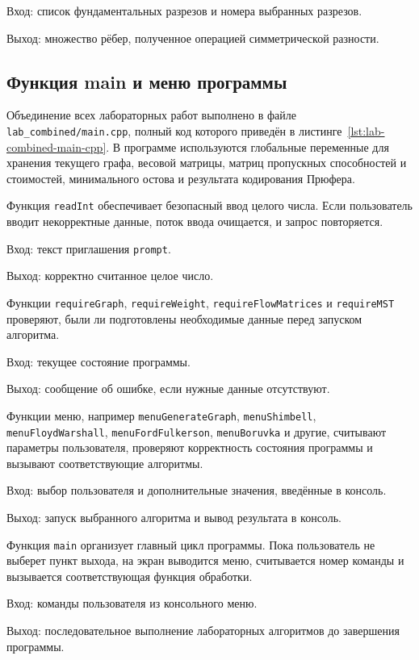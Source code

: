 \documentclass[a4paper,final]{article}
\begin{document}
Вход: список фундаментальных разрезов и номера выбранных разрезов.

Выход: множество рёбер, полученное операцией симметрической разности.

\subsection{Функция main и меню программы}

Объединение всех лабораторных работ выполнено в файле \texttt{lab\_combined/main.cpp}, полный код которого приведён в листинге~\ref{lst:lab-combined-main-cpp}. В программе используются глобальные переменные для хранения текущего графа, весовой матрицы, матриц пропускных способностей и стоимостей, минимального остова и результата кодирования Прюфера.

Функция \texttt{readInt} обеспечивает безопасный ввод целого числа. Если пользователь вводит некорректные данные, поток ввода очищается, и запрос повторяется.

Вход: текст приглашения \texttt{prompt}.

Выход: корректно считанное целое число.

Функции \texttt{requireGraph}, \texttt{requireWeight}, \texttt{requireFlowMatrices} и \texttt{requireMST} проверяют, были ли подготовлены необходимые данные перед запуском алгоритма.

Вход: текущее состояние программы.

Выход: сообщение об ошибке, если нужные данные отсутствуют.

Функции меню, например \texttt{menuGenerateGraph}, \texttt{menuShimbell}, \texttt{menuFloydWarshall}, \texttt{menuFordFulkerson}, \texttt{menuBoruvka} и другие, считывают параметры пользователя, проверяют корректность состояния программы и вызывают соответствующие алгоритмы.

Вход: выбор пользователя и дополнительные значения, введённые в консоль.

Выход: запуск выбранного алгоритма и вывод результата в консоль.

Функция \texttt{main} организует главный цикл программы. Пока пользователь не выберет пункт выхода, на экран выводится меню, считывается номер команды и вызывается соответствующая функция обработки.

Вход: команды пользователя из консольного меню.

Выход: последовательное выполнение лабораторных алгоритмов до завершения программы.
\end{document}
